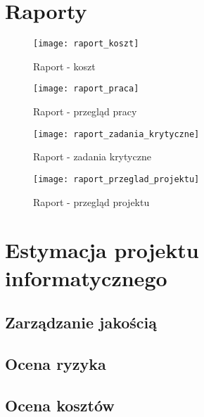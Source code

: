 \chapter{Raporty}
\begin{figure}[H]
\centering
  \texttt{[image: raport\_koszt]}
  \caption{Raport - koszt}
  \label{raport_koszt}
\end{figure}
\begin{figure}[H]
\centering
  \texttt{[image: raport\_praca]}
  \caption{Raport - przegląd pracy}
  \label{raport_praca}
\end{figure}

\begin{figure}[H]
\centering
  \texttt{[image: raport\_zadania\_krytyczne]}
  \caption{Raport - zadania krytyczne}
  \label{raport_zadania_krytyczne}
\end{figure}

\begin{figure}[H]
\centering
  \texttt{[image: raport\_przeglad\_projektu]}
  \caption{Raport - przegląd projektu}
  \label{raport_przeglad_projektu}
\end{figure}
\chapter{Estymacja projektu informatycznego}
\section{Zarządzanie jakością}
\section{Ocena ryzyka}
\section{Ocena kosztów}